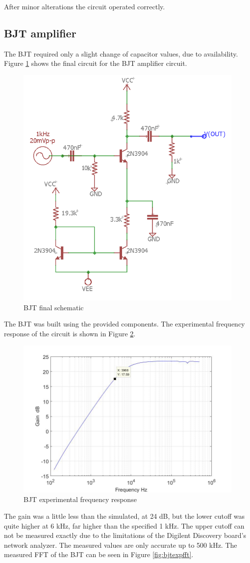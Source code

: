 After minor alterations the circuit operated correctly.



\subsection{BJT amplifier}

The BJT required only a slight change of capacitor values, due to availability. Figure \ref{fig:bjtexp} shows the final circuit for the BJT amplifier circuit.

\begin{figure}[H]
	\centering
	\includegraphics[width=0.7\linewidth]{ExperimentalImplementation/BJT_Exp}
	\caption{BJT final schematic}
	\label{fig:bjtexp}
\end{figure}

The BJT was built using the provided components. The experimental frequency response of the circuit is shown in Figure \ref{fig:bjtexpfreq}.



\begin{figure}[H]
	\centering
	\includegraphics[width=0.7\linewidth]{ExperimentalImplementation/bjt_outputexp.jpg}
	\caption{BJT experimental frequency response}
	\label{fig:bjtexpfreq}
\end{figure}
The gain was a little less than the simulated, at 24 dB, but the lower cutoff was quite higher at 6 kHz, far higher than the specified 1 kHz. The upper cutoff can not be measured exactly due to the limitations of the Digilent Discovery board's network analyzer. The measured values are only accurate up to 500 kHz. The measured FFT of the BJT can be seen in Figure \ref{fig:bjtexpfft}.

